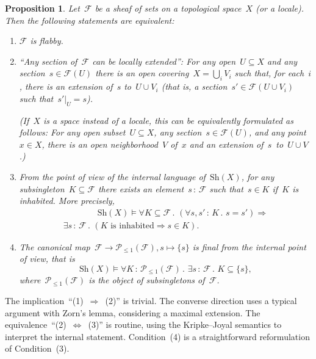 \documentclass[10pt,reqno,a4paper]{amsbook}
\makeatletter
\theoremstyle{definition}
\theoremstyle{plain}
\newtheorem{prop}[defn]{Proposition}
\theoremstyle{remark}
\newcommand{\F}{\mathcal{F}}
\renewcommand{\P}{\mathcal{P}}
\newcommand{\Sh}{\mathrm{Sh}}
\newcommand{\?}{\,{:}\,}
\renewcommand{\_}{\mathpunct{.}\,}
\renewenvironment{proof}[1][\proofname]{\par
  \pushQED{\qed}%
  \normalfont \topsep6\p@\@plus6\p@\relax
  \trivlist
  \item[\hskip\labelsep
        \itshape
    #1\@addpunct{.}]\ignorespaces
}{%
  \popQED\endtrivlist\@endpefalse
}
\makeatother
\begin{document}
\begin{prop}\label{prop:internal-char-flabbiness}
Let~$\F$ be a sheaf of sets on a topological space~$X$ (or a locale).
Then the following statements are equivalent:
\begin{enumerate}
\item $\F$ is flabby.

\item ``Any section of~$\F$ can be locally extended'':
For any open~$U \subseteq X$ and any section~$s \in \F(U)$ there is
an open covering~$X = \bigcup_i V_i$ such that, for each~$i$, there is an
extension of~$s$ to~$U \cup V_i$ (that is, a section~$s' \in \F(U \cup V_i)$
such that~$s'|_U = s$).

(If~$X$ is a space instead of a locale, this can be equivalently formulated as
follows: For any open subset~$U \subseteq X$, any section~$s \in \F(U)$, and any
point~$x \in X$, there is an open neighborhood~$V$ of~$x$ and an extension
of~$s$~to~$U \cup V$.)

\item From the point of view of the internal language of~$\Sh(X)$, for any
subsingleton~$K \subseteq \F$ there exists an element~$s \? \F$ such that~$s \in
K$ if~$K$ is inhabited. More precisely,
\begin{multline*}
  \qquad\qquad\Sh(X) \models
  \forall K \subseteq \F\_
  (\forall s,s'\?K\_ s = s') \Longrightarrow \\
  \exists s\?\F\_ (\text{$K$ is inhabited} \Rightarrow s \in K).\qquad\qquad
\end{multline*}

\item The canonical map~$\F \to \P_{\leq 1}(\F), s \mapsto \{s\}$ is
final from the internal point of view, that is
\[ \Sh(X) \models
  \forall K \? \P_{\leq 1}(\F)\_
  \exists s \? \F\_
  K \subseteq \{s\}, \]
where~$\P_{\leq 1}(\F)$ is the object of subsingletons of~$\F$.
\end{enumerate}
\end{prop}

\begin{proof}
The implication~``(1)~$\Rightarrow$~(2)'' is trivial. The converse direction uses a
typical argument with Zorn's lemma, considering a maximal extension. The
equivalence~``(2)~$\Leftrightarrow$~(3)'' is routine, using the Kripke--Joyal
semantics to interpret the internal statement. Condition~(4) is a straightforward
reformulation of Condition~(3).
\end{proof}
\end{document}
